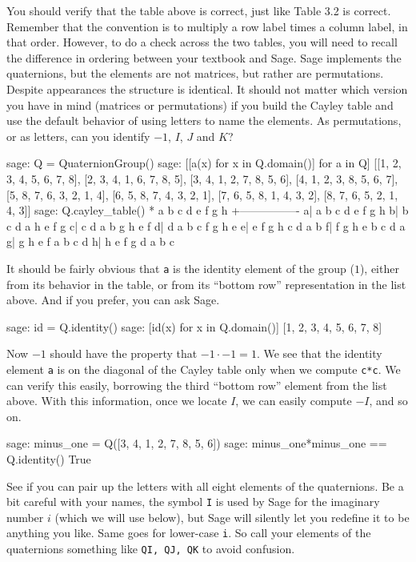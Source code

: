 %
You should verify that the table above is correct, just like Table 3.2 is correct.  Remember that the convention is to multiply a row label times a column label, in that order.  However, to do a check across the two tables, you will need to recall the difference in ordering between your textbook and Sage.
%
%
Sage implements the quaternions, but the elements are not matrices, but rather are permutations.  Despite appearances the structure is identical.  It should not matter which version you have in mind (matrices or permutations) if you build the Cayley table and use the default behavior of using letters to name the elements.  As permutations, or as letters, can you identify $-1$, $I$, $J$ and $K$?
%
\begin{sageexample}
sage: Q = QuaternionGroup()
sage: [[a(x) for x in Q.domain()] for a in Q]
[[1, 2, 3, 4, 5, 6, 7, 8], [2, 3, 4, 1, 6, 7, 8, 5],
 [3, 4, 1, 2, 7, 8, 5, 6], [4, 1, 2, 3, 8, 5, 6, 7],
 [5, 8, 7, 6, 3, 2, 1, 4], [6, 5, 8, 7, 4, 3, 2, 1],
 [7, 6, 5, 8, 1, 4, 3, 2], [8, 7, 6, 5, 2, 1, 4, 3]]
sage: Q.cayley_table()
*  a b c d e f g h
 +----------------
a| a b c d e f g h
b| b c d a h e f g
c| c d a b g h e f
d| d a b c f g h e
e| e f g h c d a b
f| f g h e b c d a
g| g h e f a b c d
h| h e f g d a b c
\end{sageexample}
%
It should be fairly obvious that \verb?a? is the identity element of the group ($1$), either from its behavior in the table, or from its ``bottom row'' representation in the list above.  And if you prefer, you can ask Sage.
%
\begin{sageexample}
sage: id = Q.identity()
sage: [id(x) for x in Q.domain()]
[1, 2, 3, 4, 5, 6, 7, 8]
\end{sageexample}
%
Now $-1$ should have the property that $-1\cdot -1= 1$.  We see that the identity element \verb?a? is on the diagonal of the Cayley table only when we compute \verb?c*c?.  We can verify this easily, borrowing the third ``bottom row'' element from the list above.  With this information, once we locate $I$, we can easily compute $-I$, and so on.
%
\begin{sageexample}
sage: minus_one = Q([3, 4, 1, 2, 7, 8, 5, 6])
sage: minus_one*minus_one == Q.identity()
True
\end{sageexample}
%
See if you can pair up the letters with all eight elements of the quaternions.  Be a bit careful with your names, the symbol \verb?I? is used by Sage for the imaginary number $i$ (which we will use below), but Sage will silently let you redefine it to be anything you like.  Same goes for lower-case \verb?i?.  So call your elements of the quaternions something like \verb?QI, QJ, QK? to avoid confusion.\par
